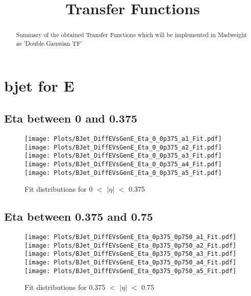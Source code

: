 \documentclass[a4paper,10pt]{article}
\title{Transfer Functions}
\begin{document}
 
\maketitle 
\begin{abstract} 
 Summary of the obtained Transfer Functions which will be implemented in Madweight as 'Double Gaussian TF' \\
\end{abstract} 

\newpage 
\section{bjet for E}
 \subsection{Eta between 0 and 0.375}
 \begin{figure}[h!b] 
  \texttt{[image: Plots/BJet\_DiffEVsGenE\_Eta\_0\_0p375\_a1\_Fit.pdf]} 
  \texttt{[image: Plots/BJet\_DiffEVsGenE\_Eta\_0\_0p375\_a2\_Fit.pdf]} \\ 
  \texttt{[image: Plots/BJet\_DiffEVsGenE\_Eta\_0\_0p375\_a3\_Fit.pdf]} 
  \texttt{[image: Plots/BJet\_DiffEVsGenE\_Eta\_0\_0p375\_a4\_Fit.pdf]} \\ 
  \texttt{[image: Plots/BJet\_DiffEVsGenE\_Eta\_0\_0p375\_a5\_Fit.pdf]} 
 \caption{Fit distributions for 0 $<$ $\vert \eta \vert$ $<$ 0.375}
 \end{figure}
 \newpage 
 \subsection{Eta between 0.375 and 0.75}
 \begin{figure}[h!b] 
  \texttt{[image: Plots/BJet\_DiffEVsGenE\_Eta\_0p375\_0p750\_a1\_Fit.pdf]} 
  \texttt{[image: Plots/BJet\_DiffEVsGenE\_Eta\_0p375\_0p750\_a2\_Fit.pdf]} \\ 
  \texttt{[image: Plots/BJet\_DiffEVsGenE\_Eta\_0p375\_0p750\_a3\_Fit.pdf]} 
  \texttt{[image: Plots/BJet\_DiffEVsGenE\_Eta\_0p375\_0p750\_a4\_Fit.pdf]} \\ 
  \texttt{[image: Plots/BJet\_DiffEVsGenE\_Eta\_0p375\_0p750\_a5\_Fit.pdf]} 
 \caption{Fit distributions for 0.375 $<$ $\vert \eta \vert$ $<$ 0.75}
 \end{figure}
 \newpage 
\end{document}

